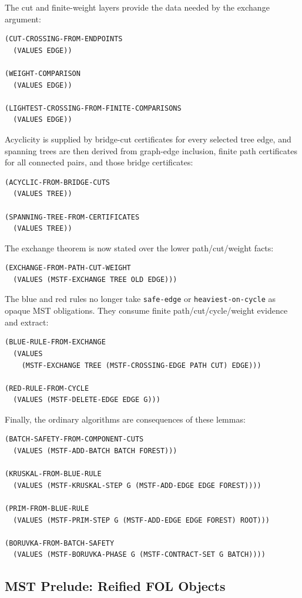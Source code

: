 \documentclass[runningheads]{llncs}
\begin{document}
The cut and finite-weight layers provide the data needed by the exchange
argument:
\begin{lstlisting}
(CUT-CROSSING-FROM-ENDPOINTS
  (VALUES EDGE))

(WEIGHT-COMPARISON
  (VALUES EDGE))

(LIGHTEST-CROSSING-FROM-FINITE-COMPARISONS
  (VALUES EDGE))
\end{lstlisting}
Acyclicity is supplied by bridge-cut certificates for every selected tree
edge, and spanning trees are then derived from graph-edge inclusion, finite
path certificates for all connected pairs, and those bridge certificates:
\begin{lstlisting}
(ACYCLIC-FROM-BRIDGE-CUTS
  (VALUES TREE))

(SPANNING-TREE-FROM-CERTIFICATES
  (VALUES TREE))
\end{lstlisting}

The exchange theorem is now stated over the lower path/cut/weight facts:
\begin{lstlisting}
(EXCHANGE-FROM-PATH-CUT-WEIGHT
  (VALUES (MSTF-EXCHANGE TREE OLD EDGE)))
\end{lstlisting}
The blue and red rules no longer take \texttt{safe-edge} or
\texttt{heaviest-on-cycle} as opaque MST obligations.  They consume finite
path/cut/cycle/weight evidence and extract:
\begin{lstlisting}
(BLUE-RULE-FROM-EXCHANGE
  (VALUES
    (MSTF-EXCHANGE TREE (MSTF-CROSSING-EDGE PATH CUT) EDGE)))

(RED-RULE-FROM-CYCLE
  (VALUES (MSTF-DELETE-EDGE EDGE G)))
\end{lstlisting}
Finally, the ordinary algorithms are consequences of these lemmas:
\begin{lstlisting}
(BATCH-SAFETY-FROM-COMPONENT-CUTS
  (VALUES (MSTF-ADD-BATCH BATCH FOREST)))

(KRUSKAL-FROM-BLUE-RULE
  (VALUES (MSTF-KRUSKAL-STEP G (MSTF-ADD-EDGE EDGE FOREST))))

(PRIM-FROM-BLUE-RULE
  (VALUES (MSTF-PRIM-STEP G (MSTF-ADD-EDGE EDGE FOREST) ROOT)))

(BORUVKA-FROM-BATCH-SAFETY
  (VALUES (MSTF-BORUVKA-PHASE G (MSTF-CONTRACT-SET G BATCH))))
\end{lstlisting}

\subsection{MST Prelude: Reified FOL Objects}
\end{document}

